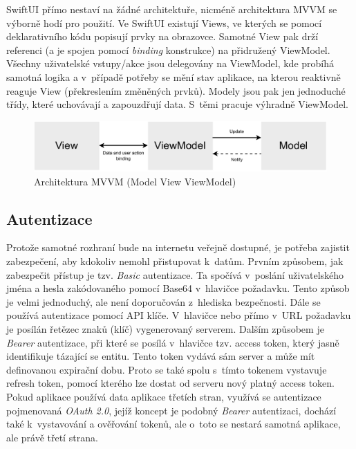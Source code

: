 \documentclass[thesis=M,czech]{FITthesis}[2019/12/23]
\begin{document}
SwiftUI přímo nestaví na žádné architektuře, nicméně architektura MVVM se výborně hodí pro použití. Ve SwiftUI existují Views, ve kterých se pomocí deklarativního kódu popisují prvky na obrazovce. Samotné View pak drží referenci (a je spojen pomocí \textit{binding} konstrukce) na přidružený ViewModel. Všechny uživatelské vstupy/akce jsou delegovány na ViewModel, kde probíhá samotná logika a v~případě potřeby se mění stav aplikace, na kterou reaktivně reaguje View (překreslením změněných prvků). Modely jsou pak jen jednoduché třídy, které uchovávají a zapouzdřují data. S~těmi pracuje výhradně ViewModel. \cite{mvvm-2}

\begin{figure}
	\centering
	\includegraphics[width=1\linewidth]{images/mvvm.pdf}
  	\caption{Architektura MVVM (Model View ViewModel)}
  	\label{img:mvvm}
\end{figure}

\subsection{Autentizace}
Protože samotné rozhraní bude na internetu veřejně dostupné, je potřeba zajistit zabezpečení, aby kdokoliv nemohl přistupovat k~datům. Prvním způsobem, jak zabezpečit přístup je tzv. \textit{Basic} autentizace. Ta spočívá v~poslání uživatelského jména a hesla zakódovaného pomocí Base64 v~hlavičce požadavku. Tento způsob je velmi jednoduchý, ale není doporučován z~hlediska bezpečnosti. Dále se používá autentizace pomocí API klíče. V~hlavičce nebo přímo v~URL požadavku je posílán řetězec znaků (klíč) vygenerovaný serverem. Dalším způsobem je \textit{Bearer} autentizace, při které se posílá v~hlavičce tzv. access token, který jasně identifikuje tázající se entitu. Tento token vydává sám server a může mít definovanou expirační dobu. Proto se také spolu s~tímto tokenem vystavuje refresh token, pomocí kterého lze dostat od serveru nový platný access token. Pokud aplikace používá data aplikace třetích stran, využívá se autentizace pojmenovaná \textit{OAuth 2.0}, jejíž koncept je podobný \textit{Bearer} autentizaci, dochází také k~vystavování a ověřování tokenů, ale o~toto se nestará samotná aplikace, ale právě třetí strana. \cite{rest-auth-1, rest-auth-2}
\end{document}
